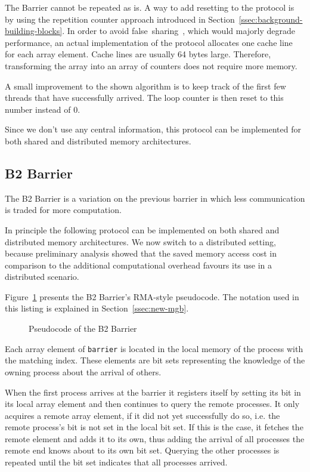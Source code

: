 \documentclass[a4paper, 10pt]{article}
\begin{document}
The Barrier cannot be repeated as is. A way to add resetting to the protocol is by using the repetition counter approach introduced in Section~\ref{ssec:background-building-blocks}. In order to avoid false~sharing~\cite{falsesharing}, which would majorly degrade performance, an actual implementation of the protocol allocates one cache line for each array element. Cache lines are usually 64 bytes large. Therefore, transforming the array into an array of counters does not require more memory.

A small improvement to the shown algorithm is to keep track of the first few threads that have successfully arrived. The loop counter is then reset to this number instead of 0.

Since we don't use any central information, this protocol can be implemented for both shared and distributed memory architectures.

\subsection{B2 Barrier}
\label{ssec:new-b2}
The B2 Barrier is a variation on the previous barrier in which less communication is traded for more computation.

In principle the following protocol can be implemented on both shared and distributed memory architectures. We now switch to a distributed setting, because preliminary analysis showed that the saved memory access cost in comparison to the additional computational overhead favours its use in a distributed scenario.

Figure~\ref{fig:pseudocode-b2} presents the B2 Barrier's RMA-style pseudocode. The notation used in this listing is explained in Section~\ref{ssec:new-mgb}.

\begin{figure}[htbp]
	\centering
	
	\caption{Pseudocode of the B2 Barrier}
	\label{fig:pseudocode-b2}
\end{figure}

Each array element of \texttt{barrier} is located in the local memory of the process with the matching index. These elements are bit sets representing the knowledge of the owning process about the arrival of others.

When the first process arrives at the barrier it registers itself by setting its bit in its local array element and then continues to query the remote processes. It only acquires a remote array element, if it did not yet successfully do so, i.e. the remote process's bit is not set in the local bit set. If this is the case, it fetches the remote element and adds it to its own, thus adding the arrival of all processes the remote end knows about to its own bit set. Querying the other processes is repeated until the bit set indicates that all processes arrived.
\end{document}
